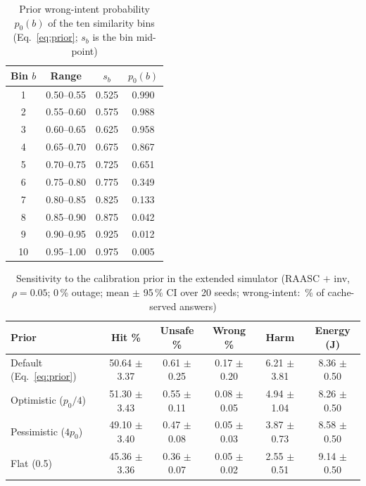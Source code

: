 \documentclass[journal]{IEEEtran}
\newcommand{\pct}{\,\%}
\begin{document}
\begin{table}[!t]
\caption{Prior wrong-intent probability $p_0(b)$ of the ten similarity bins (Eq.~\eqref{eq:prior}; $s_b$ is the bin mid-point)}
\label{tab:prior}
\centering\footnotesize
\setlength{\tabcolsep}{4pt}
\begin{tabular}{cccc}
\toprule
Bin $b$ & Range & $s_b$ & $p_0(b)$\\
\midrule
1 & 0.50--0.55 & 0.525 & 0.990\\
2 & 0.55--0.60 & 0.575 & 0.988\\
3 & 0.60--0.65 & 0.625 & 0.958\\
4 & 0.65--0.70 & 0.675 & 0.867\\
5 & 0.70--0.75 & 0.725 & 0.651\\
6 & 0.75--0.80 & 0.775 & 0.349\\
7 & 0.80--0.85 & 0.825 & 0.133\\
8 & 0.85--0.90 & 0.875 & 0.042\\
9 & 0.90--0.95 & 0.925 & 0.012\\
10 & 0.95--1.00 & 0.975 & 0.005\\
\bottomrule
\end{tabular}
\end{table}

\begin{table}[!t]
\caption{Sensitivity to the calibration prior in the extended simulator (RAASC $+$ inv, $\rho=0.05$; 0\pct{} outage; mean $\pm$ 95\pct{} CI over 20 seeds; wrong-intent: \pct{} of cache-served answers)}
\label{tab:priorsens}
\centering\scriptsize
\setlength{\tabcolsep}{1.2pt}
\begin{tabular}{lccccc}
\toprule
Prior & Hit \% & Unsafe \% & Wrong \% & Harm & Energy (J)\\
\midrule
Default (Eq.~\eqref{eq:prior}) & 50.64 $\pm$ 3.37 & 0.61 $\pm$ 0.25 & 0.17 $\pm$ 0.20 & 6.21 $\pm$ 3.81 & 8.36 $\pm$ 0.50\\
Optimistic ($p_0/4$) & 51.30 $\pm$ 3.43 & 0.55 $\pm$ 0.11 & 0.08 $\pm$ 0.05 & 4.94 $\pm$ 1.04 & 8.26 $\pm$ 0.50\\
Pessimistic ($4p_0$) & 49.10 $\pm$ 3.40 & 0.47 $\pm$ 0.08 & 0.05 $\pm$ 0.03 & 3.87 $\pm$ 0.73 & 8.58 $\pm$ 0.50\\
Flat (0.5) & 45.36 $\pm$ 3.36 & 0.36 $\pm$ 0.07 & 0.05 $\pm$ 0.02 & 2.55 $\pm$ 0.51 & 9.14 $\pm$ 0.50\\
\bottomrule
\end{tabular}
\end{table}
\end{document}
